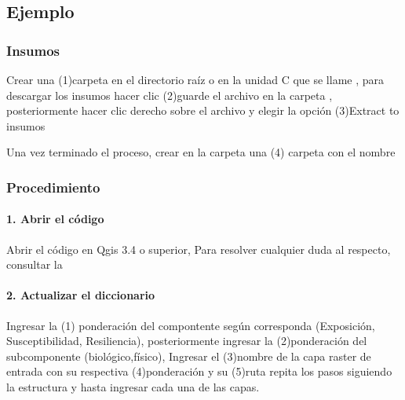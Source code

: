 \documentclass[letterpaper,10pt,spanish]{sphinxmanual}
\begin{document}
\subsection{Ejemplo}
\label{\detokenize{analisis:ejemplo}}

\subsubsection{Insumos}
\label{\detokenize{analisis:insumos}}
Crear una (1)carpeta en el directorio raíz o en la unidad C que se llame ,
para descargar los insumos hacer clic  (2)guarde el archivo 
en la carpeta , posteriormente hacer clic derecho sobre el archivo  y elegir la opción (3)Extract to insumos

\noindent{}

Una vez terminado el proceso, crear en la carpeta  una (4) carpeta con el nombre 

\noindent{}


\subsubsection{Procedimiento}
\label{\detokenize{analisis:procedimiento}}

\paragraph{1. Abrir el código}
\label{\detokenize{analisis:abrir-el-codigo}}
Abrir el código  en Qgis 3.4 o superior,
Para resolver cualquier duda al respecto, consultar la 


\paragraph{2. Actualizar el diccionario}
\label{\detokenize{analisis:actualizar-el-diccionario}}
Ingresar la (1) ponderación del compontente según corresponda (Exposición, Susceptibilidad, Resiliencia), posteriormente
ingresar la (2)ponderación del subcomponente (biológico,físico),
Ingresar el (3)nombre de la capa raster de entrada con su respectiva (4)ponderación y su (5)ruta
repita los pasos siguiendo la estructura y hasta ingresar cada una de las capas.
\end{document}
